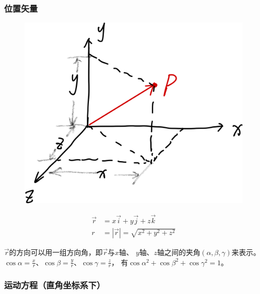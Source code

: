 \documentclass[12pt, a4paper]{article}
\begin{document}
\subsubsection{位置矢量}

    \begin{figure}
        \centering
        \includegraphics[scale=0.08]{"Chapter 01 images/pic1.png"}
        \label{pic1}
    \end{figure}

    \begin{align*}
        \overrightarrow{r} &= x\overrightarrow{i} + y\overrightarrow{j} + z\overrightarrow{k} \\
        r &= \left|\overrightarrow{r}\right| = \sqrt{x^2 + y^2 + z^2}
    \end{align*}

    \(\overrightarrow{r}\)的方向可以用一组方向角，即\(\overrightarrow{r}\)与\(x\)轴、
    \(y\)轴、\(z\)轴之间的夹角\(\left(\alpha, \beta, \gamma\right)\)来表示。
    \(\cos \alpha = \frac{x}{r}\)、\(\cos \beta = \frac{y}{r}\)、\(\cos \gamma = \frac{z}{r}\)，
    有\(\cos \alpha ^2 + \cos \beta ^2 + \cos \gamma ^2 = 1\)。

\subsubsection{运动方程（直角坐标系下）}
    
\end{document}
